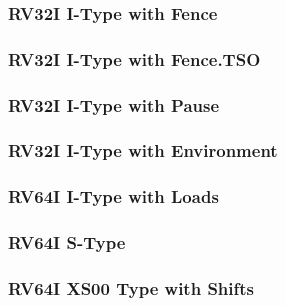 \subsubsection[{\small RV32I I-Type with Fence}]{RV32I I-Type with Fence} \label{sec:format-RV32I-IFence}



\subsubsection[{\small RV32I I-Type with Fence.TSO}]{RV32I I-Type with Fence.TSO} \label{sec:format-RV32I-IFence-TSO}



\subsubsection[{\small RV32I I-Type with Pause}]{RV32I I-Type with Pause} \label{sec:format-RV32I-IPause}



\subsubsection[{\small RV32I I-Type with Environment}]{RV32I I-Type with Environment} \label{sec:format-RV32I-IEnv}



\subsubsection[{\small RV64I I-Type with Loads}]{RV64I I-Type with Loads} \label{sec:format-RV64I-ILoad}



\subsubsection[{\small RV64I S-Type}]{RV64I S-Type} \label{sec:format-RV64I-SType}



\subsubsection[{\small RV64I XS00 Type with Shifts}]{RV64I XS00 Type with Shifts} \label{sec:format-RV64I-XS00}

